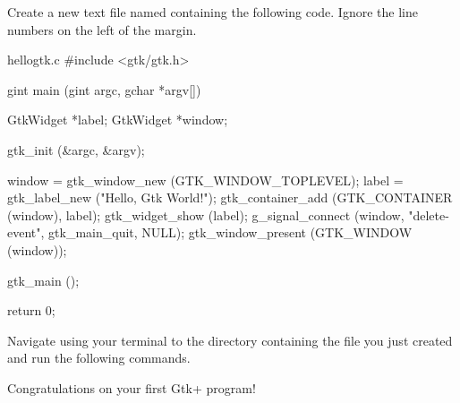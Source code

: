 Create a new text file named  containing the following code.
Ignore the line numbers on the left of the margin.

\begin{code}{hellogtk.c}
#include <gtk/gtk.h>

gint
main (gint   argc,
      gchar *argv[])
{
    GtkWidget *label;
    GtkWidget *window;

    gtk_init (&argc, &argv);

    window = gtk_window_new (GTK_WINDOW_TOPLEVEL);
    label = gtk_label_new ("Hello, Gtk World!");
    gtk_container_add (GTK_CONTAINER (window), label);
    gtk_widget_show (label);
    g_signal_connect (window, "delete-event", gtk_main_quit, NULL);
    gtk_window_present (GTK_WINDOW (window));

    gtk_main ();

    return 0;
}
\end{code}

Navigate using your terminal to the directory containing the file you just
created and run the following commands.


Congratulations on your first Gtk+ program!
